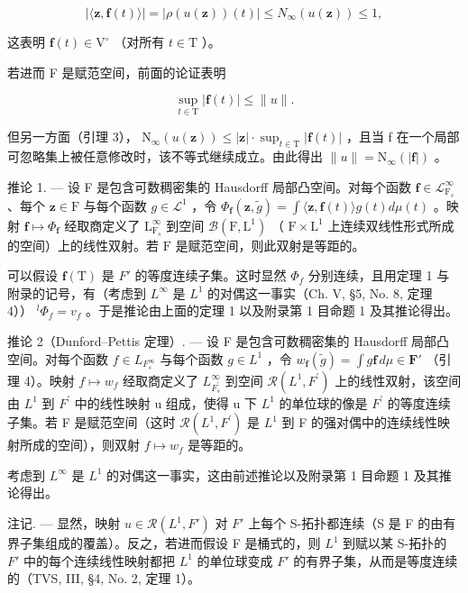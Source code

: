 \[
\left| \langle \mathbf {z}, \mathbf {f} (t) \rangle \right| = \left| \rho (u (\mathbf {z})) (t) \right| \leqslant N _ {\infty} (u (\mathbf {z})) \leqslant 1,
\]

这表明 \(\mathbf{f}(t) \in \mathrm{V}^{\circ}\) （对所有 \(t \in \mathrm{T}\) ）。

若进而 F 是赋范空间，前面的论证表明

\[
\sup _ {t \in \mathrm{T}} | \mathbf {f} (t) | \leqslant \| u \|.
\]

但另一方面（引理 3）， \(\mathrm{N}_{\infty}(u(\mathbf{z})) \leqslant |\mathbf{z}| \cdot \sup_{t \in \mathrm{T}} |\mathbf{f}(t)|\) ，且当 f 在一个局部可忽略集上被任意修改时，该不等式继续成立。由此得出 \(\|u\| = \mathrm{N}_{\infty}(|\mathbf{f}|)\) 。

推论 1. --- 设 F 是包含可数稠密集的 Hausdorff 局部凸空间。对每个函数 \(\mathbf{f} \in \mathcal{L}_{\mathrm{F}_s}^\infty\) 、每个 \(\mathbf{z} \in \mathrm{F}\) 与每个函数 \(g \in \mathcal{L}^1\) ，令 \(\Phi_{\mathbf{f}}(\mathbf{z}, \widetilde{g}) = \int \langle \mathbf{z}, \mathbf{f}(t) \rangle g(t) d\mu(t)\) 。映射 \(\mathbf{f} \mapsto \Phi_{\mathbf{f}}\) 经取商定义了 \(\mathrm{L}_{\mathrm{F}_s}^\infty\) 到空间 \(\mathcal{B}(\mathrm{F}, \mathrm{L}^1)\) （ \(\mathrm{F} \times \mathrm{L}^1\) 上连续双线性形式所成的空间）上的线性双射。若 \(\mathrm{F}\) 是赋范空间，则此双射是等距的。

可以假设 \(\mathbf{f}(\mathrm{T})\) 是 \(F'\) 的等度连续子集。这时显然 \(\Phi_{f}\) 分别连续，且用定理 1 与附录的记号，有（考虑到 \(L^{\infty}\) 是 \(L^{1}\) 的对偶这一事实（Ch. V, §5, No. 8, 定理 4）） \(^{l}\Phi_{f}=v_{f}\) 。于是推论由上面的定理 1 以及附录第 1 目命题 1 及其推论得出。

推论 2（Dunford--Pettis 定理）. --- 设 F 是包含可数稠密集的 Hausdorff 局部凸空间。对每个函数 \(f \in L_{F_{s}^{\infty}}\) 与每个函数 \(g \in L^{1}\) ，令 \(w_{\mathbf{f}}(\widetilde{g}) = \int g\mathbf{f} \, d\mu \in \mathbf{F}'\) （引理 4）。映射 \(f \mapsto w_{f}\) 经取商定义了 \(L_{F_{s}^{\prime}}^{\infty}\) 到空间 \(\mathcal{R}(L^{1}, F^{\prime})\) 上的线性双射，该空间由 \(L^{1}\) 到 \(F^{\prime}\) 中的线性映射 u 组成，使得 u 下 \(L^{1}\) 的单位球的像是 \(F^{\prime}\) 的等度连续子集。若 F 是赋范空间（这时 \(\mathcal{R}(L^{1}, F^{\prime})\) 是 \(L^{1}\) 到 F 的强对偶中的连续线性映射所成的空间），则双射 \(f \mapsto w_{f}\) 是等距的。

考虑到 \(L^{\infty}\) 是 \(L^{1}\) 的对偶这一事实，这由前述推论以及附录第 1 目命题 1 及其推论得出。

注记. --- 显然，映射 \(u \in \mathcal{R}(L^{1}, F')\) 对 \(F'\) 上每个 S-拓扑都连续（S 是 F 的由有界子集组成的覆盖）。反之，若进而假设 F 是桶式的，则 \(L^{1}\) 到赋以某 S-拓扑的 \(F'\) 中的每个连续线性映射都把 \(L^{1}\) 的单位球变成 \(F'\) 的有界子集，从而是等度连续的（TVS, III, §4, No. 2, 定理 1）。


